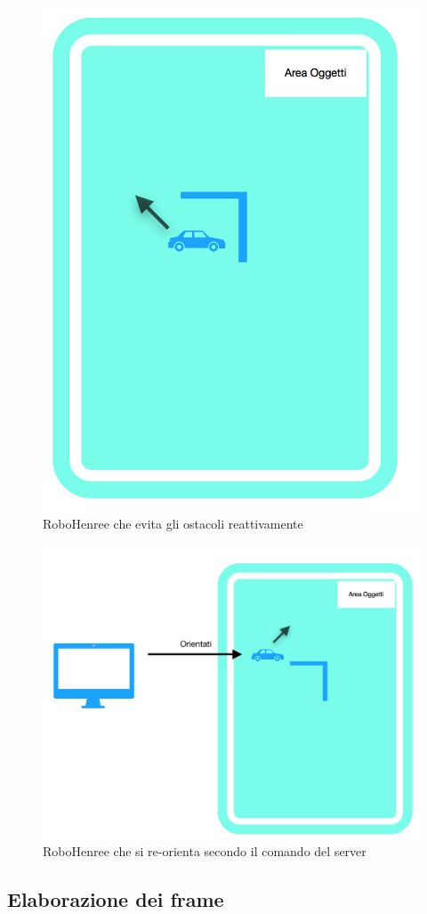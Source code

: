 \documentclass[a4paper,12pt,italian]{article}
\begin{document}
\begin{figure}[H]
	\begin{center}
	\includegraphics[scale=0.3]{movimento_3.png}
	\caption{RoboHenree che evita gli ostacoli reattivamente}
	\label{Fig: movimento_3}
	\end{center}
\end{figure}

\begin{figure}[H]
	\begin{center}
	\includegraphics[scale=0.3]{movimento_4.png}
	\caption{RoboHenree che si re-orienta secondo il comando del server}
	\label{Fig: movimento_4}
	\end{center}
\end{figure}

\subsection{Elaborazione dei frame}
\end{document}

